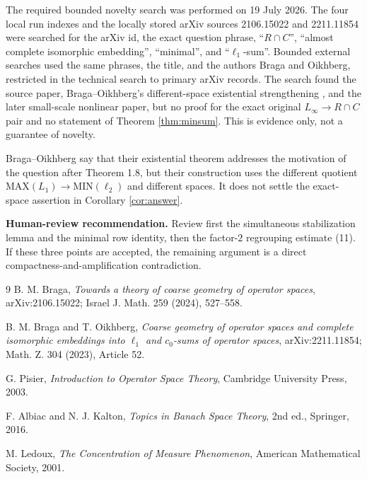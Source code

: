 \documentclass[11pt]{article}
\newcommand{\MIN}{\mathrm{MIN}}
\newcommand{\MAX}{\mathrm{MAX}}
\begin{document}
The required bounded novelty search was performed on 19 July 2026.  The four
local run indexes and the locally stored arXiv sources 2106.15022 and
2211.11854 were searched for the arXiv id, the exact question phrase,
``$R\cap C$'', ``almost complete isomorphic embedding'', ``minimal'', and
``$\ell_1$-sum''.  Bounded external searches used the same phrases, the title,
and the authors Braga and Oikhberg, restricted in the technical search to
primary arXiv records.  The search found the source paper, Braga--Oikhberg's
different-space existential strengthening \cite{BragaOikhberg2022}, and the
later small-scale nonlinear paper, but no proof for the exact original
$L_\infty\to R\cap C$ pair and no statement of Theorem \ref{thm:minsum}.
This is evidence only, not a guarantee of novelty.

Braga--Oikhberg say that their existential theorem addresses the motivation
of the question after Theorem 1.8, but their construction uses the different
quotient $\MAX(L_1)\to\MIN(\ell_2)$ and different spaces.  It does not settle
the exact-space assertion in Corollary \ref{cor:answer}.

\medskip
\noindent\textbf{Human-review recommendation.}  Review first the simultaneous
stabilization lemma and the minimal row identity, then the factor-$2$
regrouping estimate (11).  If these three points are accepted, the remaining
argument is a direct compactness-and-amplification contradiction.

\begin{thebibliography}{9}
B. M. Braga,
\emph{Towards a theory of coarse geometry of operator spaces},
arXiv:2106.15022; Israel J. Math. 259 (2024), 527--558.

B. M. Braga and T. Oikhberg,
\emph{Coarse geometry of operator spaces and complete isomorphic embeddings
into $\ell_1$ and $c_0$-sums of operator spaces},
arXiv:2211.11854; Math. Z. 304 (2023), Article 52.

G. Pisier,
\emph{Introduction to Operator Space Theory},
Cambridge University Press, 2003.

F. Albiac and N. J. Kalton,
\emph{Topics in Banach Space Theory}, 2nd ed., Springer, 2016.

M. Ledoux,
\emph{The Concentration of Measure Phenomenon},
American Mathematical Society, 2001.
\end{thebibliography}
\end{document}
